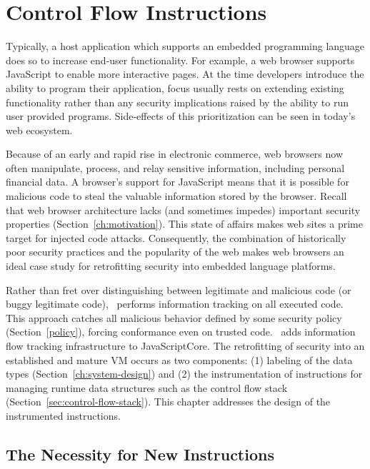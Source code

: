 
\newcommand{\popj}{\code{POPJ\_CFLABEL} }
\newcommand{\dup}{\code{DUP\_CFLABEL} }
\newcommand{\join}{\code{JOIN\_CFLABEL} }

\chapter{Control Flow Instructions}
\label{ch:instructions}

Typically, a host application which supports an embedded programming language does so to increase end-user functionality.
For example, a web browser supports JavaScript to enable more interactive pages.
At the time developers introduce the ability to program their application, focus usually rests on extending existing functionality rather than any security implications raised by the ability to run user provided programs.
Side-effects of this prioritization can be seen in today's web ecosystem.

Because of an early and rapid rise in electronic commerce, web browsers now often manipulate, process, and relay sensitive information, including personal financial data.
A browser's support for JavaScript means that it is possible for malicious code to steal the valuable information stored by the browser.
Recall that web browser architecture lacks (and sometimes impedes) important security properties (Section~\ref{ch:motivation}).
This state of affairs makes web sites a prime target for injected code attacks.
Consequently, the combination of historically poor security practices and the popularity of the web makes web browsers an ideal case study for retrofitting security into embedded language platforms.

Rather than fret over distinguishing between legitimate and malicious code (or buggy legitimate code), \FlowCore\ performs information tracking on all executed code.
This approach catches all malicious behavior defined by some security policy (Section~\ref{policy}), forcing conformance even on trusted code.
\FlowCore\ adds information flow tracking infrastructure to JavaScriptCore.
The retrofitting of security into an established and mature VM occurs as two components:
(1) labeling of the data types (Section~\ref{ch:system-design}) and
(2) the instrumentation of instructions for managing runtime data structures such as the control flow stack (Section~\ref{sec:control-flow-stack}).
This chapter addresses the design of the instrumented instructions.

\section{The Necessity for New Instructions}

